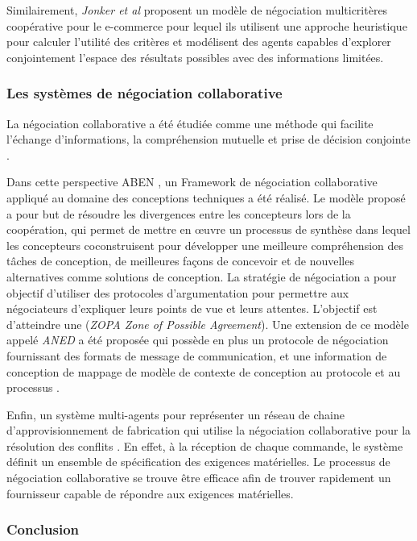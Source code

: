 			Similairement, \emph{Jonker et al} \cite{jonker2007agent} proposent un modèle de négociation multicritères coopérative pour le e-commerce pour lequel ils utilisent une approche heuristique pour calculer l'utilité des critères et modélisent des agents capables d'explorer conjointement l'espace des résultats possibles avec des informations limitées. 
			
			\subsubsection{Les systèmes de négociation collaborative}
			
			La négociation collaborative a été étudiée comme une méthode qui facilite l'échange d'informations, la compréhension mutuelle et prise de décision conjointe \cite{jin2010study}. 
			
			Dans cette perspective ABEN \cite{jin2009argumentation}, un Framework de négociation collaborative appliqué au domaine des conceptions techniques a été réalisé. Le modèle proposé a pour but de résoudre les divergences entre les concepteurs lors de la coopération, qui permet de mettre en œuvre un processus de synthèse dans lequel les concepteurs coconstruisent pour développer une meilleure compréhension des tâches de conception, de meilleures façons de concevoir et de nouvelles alternatives comme solutions de conception. La stratégie de négociation a pour objectif d'utiliser des protocoles d'argumentation pour permettre aux négociateurs d'expliquer leurs points de vue et leurs attentes. L'objectif est d'atteindre une (\emph{ZOPA  Zone of Possible Agreement}). Une extension de ce modèle appelé \emph{ANED} a été proposée qui possède en plus un protocole de négociation fournissant des formats de message de communication, et une information de conception de mappage de modèle de contexte de conception au protocole et au processus \cite{jin2010study}. 
			
			Enfin, un système multi-agents pour représenter un réseau de chaine d'approvisionnement de fabrication qui utilise la négociation collaborative pour la résolution des conflits \cite{jiao2006agent}. En effet, à la réception de chaque commande, le système définit un ensemble de spécification des exigences matérielles. Le processus de négociation collaborative se trouve être efficace afin de trouver rapidement un fournisseur capable de répondre aux exigences matérielles.
			
			\subsubsection{Conclusion}
			
